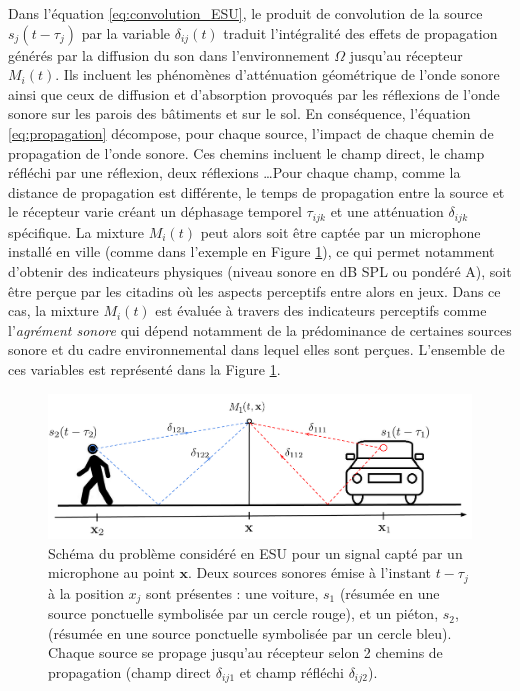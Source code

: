 Dans l'équation \ref{eq:convolution_ESU}, le produit de convolution de la source $s_j(t-\tau_j)$ par la variable $\delta_{ij}(t)$ traduit l'intégralité des effets de propagation générés par la diffusion du son dans l'environnement $\Omega$ jusqu'au récepteur $M_i(t)$. Ils incluent les phénomènes d'atténuation géométrique de l'onde sonore ainsi que ceux de diffusion et d'absorption provoqués par les réflexions de l'onde sonore sur les parois des bâtiments et sur le sol.
En conséquence, l'équation \ref{eq:propagation} décompose, pour chaque source, l'impact de chaque chemin de propagation de l'onde sonore. Ces chemins incluent le champ direct, le champ réfléchi par une réflexion, deux réflexions \dots Pour chaque champ, comme la distance de propagation est différente, le temps de propagation entre la source et le récepteur varie créant un déphasage temporel $\tau_{ijk}$ et une atténuation $\delta_{ijk}$ spécifique. 
La mixture $M_{i}(t)$ peut alors soit être captée par un microphone installé en ville (comme dans l'exemple en Figure \ref{fig:schema_ville}), ce qui permet notamment d'obtenir des indicateurs physiques (niveau sonore en dB SPL ou pondéré A), soit être perçue par les citadins où les aspects perceptifs entre alors en jeux. Dans ce cas, la mixture $M_{i}(t)$ est évaluée à travers des indicateurs perceptifs comme l'\textit{agrément sonore} qui dépend notamment de la prédominance de certaines sources sonore et du cadre environnemental dans lequel elles sont perçues. L'ensemble de ces variables est représenté dans la Figure \ref{fig:schema_ville}. 

\begin{figure}[hbtp]
\centering
\includegraphics[width=.9\linewidth]{./figures/autres/schema_ville_propa.pdf}
\caption{Schéma du problème considéré en ESU pour un signal capté par un microphone au point $\mathbf{x}$. Deux sources sonores émise à l'instant $t-\tau_{j}$ à la position $x_j$ sont présentes : une voiture, $s_{1}$ (résumée en une source ponctuelle symbolisée par un cercle rouge), et un piéton, $s_2$, (résumée en une source ponctuelle symbolisée par un cercle bleu). Chaque source se propage jusqu'au récepteur selon 2 chemins de propagation (champ direct $\delta_{ij1}$ et champ réfléchi $\delta_{ij2}$).}
\label{fig:schema_ville}
\end{figure}

